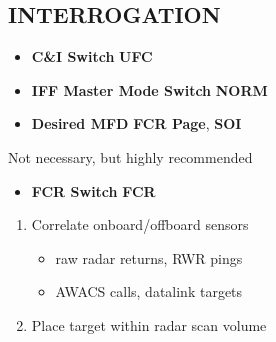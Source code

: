 \subsection{INTERROGATION}
\label{sec:iff:interrogation}
\begin{checklistenumerate}
    \blueitem[Prerequisites]
    \begin{itemize}
        \item \textbf{C\&I Switch} \dotfill \textbf{UFC}
        \item \textbf{IFF Master Mode Switch} \dotfill \textbf{NORM}
        \item \textbf{Desired MFD} \dotfill \textbf{FCR Page}, \textbf{SOI}
    \end{itemize}
    
    Not necessary, but highly recommended
    
    \begin{itemize}
        \item \textbf{FCR Switch} \dotfill \textbf{FCR}
    \end{itemize}
    \begin{enumerate}
        \item Correlate onboard/offboard sensors
        \begin{itemize}
            \item raw radar returns, RWR pings
            \item AWACS calls, datalink targets
        \end{itemize}
        \item Place target within radar scan volume
    \end{enumerate}
    \blueitem[Interrogate]


\end{checklistenumerate}
